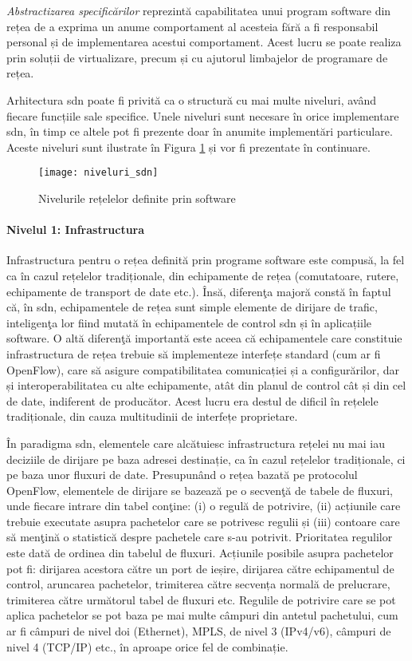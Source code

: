 \textit{Abstractizarea specificărilor} reprezintă capabilitatea unui program software din rețea de a exprima un anume comportament al acesteia fără a fi responsabil personal și de implementarea acestui comportament. Acest lucru se poate realiza prin soluții de virtualizare, precum și cu ajutorul limbajelor de programare de rețea.

Arhitectura \gls{sdn} poate fi privită ca o structură cu mai multe niveluri, având fiecare funcțiile sale specifice. Unele niveluri sunt necesare în orice implementare \gls{sdn}, în timp ce altele pot fi prezente doar în anumite implementări particulare. Aceste niveluri sunt ilustrate în Figura \ref{fig:niveluri_sdn} și vor fi prezentate în continuare.

\begin{figure}[h]
	\centering
	\texttt{[image: niveluri\_sdn]}
	\caption{Nivelurile rețelelor definite prin software}
	\label{fig:niveluri_sdn}
\end{figure}


\paragraph{Nivelul 1: Infrastructura}

Infrastructura pentru o rețea definită prin programe software este compusă, la fel ca în cazul rețelelor tradiționale, din echipamente de rețea (comutatoare, rutere, echipamente de transport de date etc.). Însă, diferenţa majoră constă în faptul că, în \gls{sdn}, echipamentele de rețea sunt simple elemente de dirijare de trafic, inteligenţa lor fiind mutată în echipamentele de control \gls{sdn} și în aplicațiile software. O altă diferenţă importantă este aceea că echipamentele care constituie infrastructura de rețea trebuie să implementeze interfețe standard (cum ar fi OpenFlow), care să asigure compatibilitatea comunicației și a configurărilor, dar și interoperabilitatea cu alte echipamente, atât din planul de control cât și din cel de date, indiferent de producător. Acest lucru era destul de dificil în rețelele tradiționale, din cauza multitudinii de interfețe proprietare.

În paradigma \gls{sdn}, elementele care alcătuiesc infrastructura rețelei nu mai iau deciziile de dirijare pe baza adresei destinație, ca în cazul rețelelor tradiționale, ci pe baza unor fluxuri de date. Presupunând o rețea bazată pe protocolul OpenFlow, elementele de dirijare se bazează pe o secvenţă de tabele de fluxuri, unde fiecare intrare din tabel conţine: (i) o regulă de potrivire, (ii) acțiunile care trebuie executate asupra pachetelor care se potrivesc regulii și (iii) contoare care să menţină o statistică despre pachetele care s-au potrivit. Prioritatea regulilor este dată de ordinea din tabelul de fluxuri. Acțiunile posibile asupra pachetelor pot fi: dirijarea acestora către un port de ieșire, dirijarea către echipamentul de control, aruncarea pachetelor, trimiterea către secvența normală de prelucrare, trimiterea către următorul tabel de fluxuri etc. Regulile de potrivire care se pot aplica pachetelor se pot baza pe mai multe câmpuri din antetul pachetului, cum ar fi câmpuri de nivel doi (Ethernet), MPLS, de nivel 3 (IPv4/v6), câmpuri de nivel 4 (TCP/IP) etc., în aproape orice fel de combinație.

